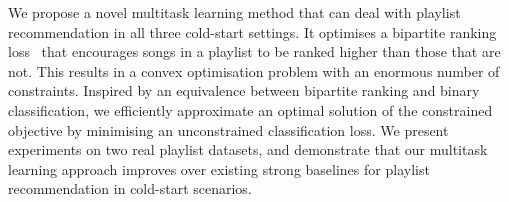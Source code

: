 We propose a novel multitask learning method that %
can deal with %
playlist recommendation in all three cold-start settings.
It optimises a bipartite ranking loss~\cite{Freund:2003,Agarwal:2005}
that encourages songs in a playlist to be ranked higher than those that are not.
This results in a convex optimisation problem with an enormous number of constraints.
Inspired by an equivalence between bipartite ranking and binary classification,
we efficiently approximate an optimal solution of the constrained objective 
by minimising an unconstrained classification loss.
%
%
%
%
We present experiments on two real playlist datasets, %
and demonstrate that our multitask learning approach improves over existing strong baselines 
for playlist recommendation in cold-start scenarios.
%
%
